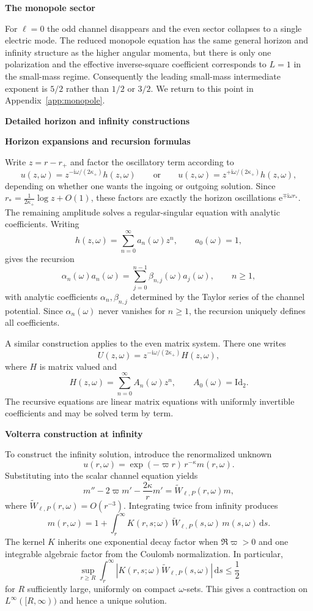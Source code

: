 \documentclass[12pt]{article}
\numberwithin{equation}{section}
\theoremstyle{plain}
\theoremstyle{definition}
\theoremstyle{remark}
\newcommand{\ii}{\mathrm i}
\newcommand{\ee}{\mathrm e}
\newcommand{\dd}{\mathrm d}
\newcommand{\om}{\omega}
\newcommand{\vp}{\varpi}
\newcommand{\kap}{\kappa}
\newcommand{\abs}[1]{\left|#1\right|}
\newcommand{\Id}{\mathrm{Id}}
\newcommand{\appheading}[1]{\par\medskip\noindent\textbf{#1}\par\smallskip\noindent}
\newcommand{\applabelheading}[2]{\par\medskip\phantomsection\label{#2}\noindent\textbf{#1}\par\smallskip\noindent}
\begin{document}
\appheading{The monopole sector}

For $\ell=0$ the odd channel disappears and the even sector collapses to a single electric mode.  The reduced monopole equation has the same general horizon and infinity structure as the higher angular momenta, but there is only one polarization and the effective inverse-square coefficient corresponds to $L=1$ in the small-mass regime.  Consequently the leading small-mass intermediate exponent is $5/2$ rather than $1/2$ or $3/2$.  We return to this point in Appendix~\ref{app:monopole}.

\applabelheading{Detailed horizon and infinity constructions}{app:horizon_infinity}
\appheading{Horizon expansions and recursion formulas}

Write $z=r-r_+$ and factor the oscillatory term according to
\[
   u(z,\om)=z^{-\ii\om/(2\kappa_+)}h(z,\om)
   \qquad\text{or}\qquad
   u(z,\om)=z^{+\ii\om/(2\kappa_+)}h(z,\om),
\]
depending on whether one wants the ingoing or outgoing solution.  Since $r_*= \frac1{2\kappa_+}\log z+O(1)$, these factors are exactly the horizon oscillations $\ee^{\mp\ii\om r_*}$.  The remaining amplitude solves a regular-singular equation with analytic coefficients.  Writing
\[
   h(z,\om)=\sum_{n=0}^{\infty}a_n(\om)z^n,
   \qquad a_0(\om)=1,
\]
gives the recursion
\begin{equation}\label{eq:app_horizon_recursion}
   \alpha_n(\om)a_n(\om)
   =
   \sum_{j=0}^{n-1}\beta_{n,j}(\om)a_j(\om),
   \qquad n\ge1,
\end{equation}
with analytic coefficients $\alpha_n,\beta_{n,j}$ determined by the Taylor series of the channel potential.  Since $\alpha_n(\om)$ never vanishes for $n\ge1$, the recursion uniquely defines all coefficients.

A similar construction applies to the even matrix system.  There one writes
\[
   U(z,\om)=z^{-\ii\om/(2\kappa_+)}H(z,\om),
\]
where $H$ is matrix valued and
\[
   H(z,\om)=\sum_{n=0}^{\infty}A_n(\om)z^n,
   \qquad
   A_0(\om)=\Id_2.
\]
The recursive equations are linear matrix equations with uniformly invertible coefficients and may be solved term by term.

\appheading{Volterra construction at infinity}

To construct the infinity solution, introduce the renormalized unknown
\[
   u(r,\om)=\exp(-\vp r)\,r^{-\kap}m(r,\om).
\]
Substituting into the scalar channel equation yields
\[
   m''-2\vp m' -\frac{2\kap}{r}m'
   =
   \widetilde W_{\ell,P}(r,\om)m,
\]
where $\widetilde W_{\ell,P}(r,\om)=O(r^{-3})$.  Integrating twice from infinity produces
\begin{equation}\label{eq:app_volterra}
   m(r,\om)=1+\int_r^\infty K(r,s;\om)\,\widetilde W_{\ell,P}(s,\om)\,m(s,\om)\,\dd s.
\end{equation}
The kernel $K$ inherits one exponential decay factor when $\Re\vp>0$ and one integrable algebraic factor from the Coulomb normalization.  In particular,
\[
   \sup_{r\ge R}\int_r^\infty \abs{K(r,s;\om)\widetilde W_{\ell,P}(s,\om)}\,\dd s
   \le \frac12
\]
for $R$ sufficiently large, uniformly on compact $\om$-sets.  This gives a contraction on $L^\infty([R,\infty))$ and hence a unique solution.
\end{document}
